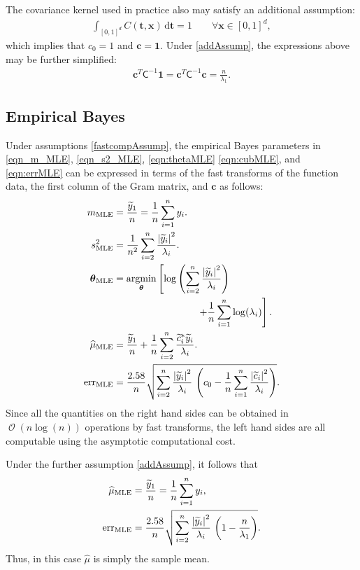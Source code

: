\documentclass[twocolumn]{svjour3}          %
\DeclareMathOperator{\Order}{{\mathcal O}}
\newcommand{\bm}[1]{\boldsymbol{#1}}
\newcommand{\D}[1]{\text{d}{#1}}
\newcommand{\vtheta}{{\bm{\theta}}}
\newcommand{\vc}{\bm{c}}
\newcommand{\vt}{\bm{t}}
\newcommand{\vx}{\bm{x}}
\newcommand{\vone}{\bm{1}}
\newcommand{\mCInv}{{\mathsf{C}^{-1}}}
\newcommand{\hmu}{\widehat{\mu}}
\newcommand{\MLE}{\textup{MLE}}
\newcommand{\err}{\textup{err}}
\def\abs#1{\ensuremath{\left \lvert #1 \right \rvert}}
\providecommand{\argmin}{\operatorname*{argmin}}
\begin{document}
The covariance kernel used in practice also may satisfy an additional assumption:
\begin{align} \label{addAssump}
\int_{[0,1]^d} C(\vt,\vx) \, \D \vt = 1 \qquad \forall \vx \in [0,1]^d,
\end{align}
which implies that $c_0 = 1$ and $\vc = \vone$.  Under \eqref{addAssump}, the expressions above may be further simplified:
\begin{align*}
\vc^T\mCInv \vone =
\vc^T\mCInv \vc = \frac{n}{\lambda_1}.
\end{align*}


\subsection{Empirical Bayes}

Under assumptions \eqref{fastcompAssump}, the empirical Bayes parameters in \eqref{eqn_m_MLE}, \eqref{eqn_s2_MLE}, \eqref{eqn:thetaMLE} \eqref{eqn:cubMLE}, and \eqref{eqn:errMLE} can be expressed in terms of the fast transforms of the function data, the first column of the Gram matrix, and $\vc$ as follows:
\begin{align}
\nonumber
m_\MLE &=  \frac{\widetilde{y}_1}{n} = \frac 1n \sum_{i=1}^n y_i.
\\
\nonumber
s^2_\MLE 
& =
\frac{1}{n^2} 
\sum_{i=2}^n \frac{\abs{\widetilde{y}_i}^2}{\lambda_i}. \\
\nonumber
\vtheta_\MLE
&= 
\argmin_{\vtheta}
\left[
\log\left(
\sum_{i=2}^n \frac{\abs{\widetilde{y}_i}^2}{\lambda_i}
\right) \right .\\
\label{eqn_MLE_loss_func_optimized_2}
& \hspace{3cm} \left .
  + 
\frac{1}{n}\sum_{i=1}^n \log(\lambda_i)
\right].
\\
\nonumber
\hmu_\MLE  &= 
\frac{\widetilde{y}_1}{n} +
\frac 1n \sum_{i=2}^n \frac{ \widetilde{c}_i^* \widetilde{y}_i}{\lambda_i}. \\
\nonumber
\err_\MLE  &
=
\frac{2.58}{n}\sqrt{
	\sum_{i=2}^{n} \frac{\abs{\widetilde{y}_i}^2}{\lambda_i}  
	\,
	\left( c_0 - \frac 1n \sum_{i=1}^n \frac{\abs{\widetilde{c}_i}^2}{\lambda_i} \right) 
}.
\end{align}
Since all the quantities on the right hand sides can be obtained in $\Order(n \log(n))$ operations by fast transforms, the left hand sides are all computable using the asymptotic computational cost.

Under the further assumption \eqref{addAssump}, it follows that 
\begin{align}
\nonumber
\hmu_\MLE  &= 
\frac{\widetilde{y}_1}{n} = \frac 1n \sum_{i=1}^n y_i,\\
\label{eq:errMLEAllAsump}
\err_\MLE  &
=
\frac{2.58}{n}\sqrt{
	\sum_{i=2}^{n} \frac{\abs{\widetilde{y}_i}^2}{\lambda_i}  
	\,
	\left( 1 -  \frac{n}{\lambda_1} \right) 
}.
\end{align}
Thus, in this  case $\hmu$ is simply the sample mean.
\end{document}
